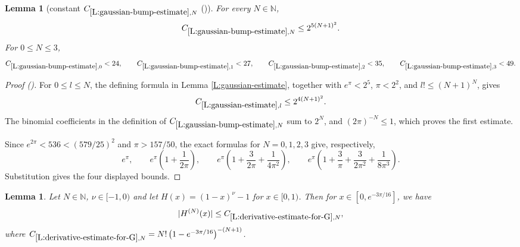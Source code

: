 \documentclass[12pt,reqno]{amsart}
\newcommand{\auto}{{({\tiny\faCar})}}
\theoremstyle{plain}
\newtheorem{lemma}[theorem]{Lemma}
\numberwithin{equation}{section}
\theoremstyle{remark}
\newcommand{\using}[1]{}
\newcommand{\N}{{\mathbb N}}
\newcommand{\jr}[1]{{\color{orange}{[J: #1]}}}
\newcommand{\cgpt}{\tikz\fill[teal!70!black,scale=0.4](0,.35) -- (.25,0) -- (1,.7) -- (.25,.15) -- cycle;}
\begin{document}
\begin{lemma}[constant $C_{\ref{L:gaussian-bump-estimate},N}$ \auto]\label{constant gaussian bump estimate}\using{L:gaussian-estimate}\using{L:gaussian-bump-estimate}
For every $N\in\N$,
\begin{equation}\label{constant gaussian bump estimate bound}
C_{\ref{L:gaussian-bump-estimate},N}\le2^{5(N+1)^2}.
\end{equation}
For $0\le N\le3$,
\begin{equation}\label{auto:constant-gaussian-bump-estimate-small}
C_{\ref{L:gaussian-bump-estimate},0}<24,\qquad
C_{\ref{L:gaussian-bump-estimate},1}<27,\qquad
C_{\ref{L:gaussian-bump-estimate},2}<35,\qquad
C_{\ref{L:gaussian-bump-estimate},3}<49.
\end{equation}
\end{lemma}
\begin{proof}[Proof \auto]
For $0\le l\le N$, the defining formula in Lemma \ref{L:gaussian-estimate}, together with $e^\pi<2^5$, $\pi<2^2$, and $l!\le (N+1)^N$, gives
\[
C_{\ref{L:gaussian-estimate},l}\le2^{4(N+1)^2}.
\]
The binomial coefficients in the definition of $C_{\ref{L:gaussian-bump-estimate},N}$ sum to $2^N$, and $(2\pi)^{-N}\le1$, which proves the first estimate.

Since $e^{2\pi}<536<(579/25)^2$ and $\pi>157/50$, the exact formulas for $N=0,1,2,3$ give, respectively,
\[
e^\pi,
\qquad
e^\pi\left(1+\frac1{2\pi}\right),
\qquad
e^\pi\left(1+\frac3{2\pi}+\frac1{4\pi^2}\right),
\qquad
e^\pi\left(1+\frac3\pi+\frac3{2\pi^2}+\frac1{8\pi^3}\right).
\]
Substitution gives the four displayed bounds.\jr{GPT: Another example of constant waste. When aboslute constants are $<1000$ you don't have to use a power of $2$, instead use the smaller number \cgpt}\jr{GPT: On second thought, we might be making formalization unnecessarily difficult here with these constant evaluations. Please here and in the rest of the manuscript, simplify estimates of expressions involving universal constants as follows: use only the estimate $2<e<3$ for $e$ and the estimate $3<\pi<4$ for $\pi$. If this makes some constants a bit larger, that is acceptable.}
\end{proof}


\begin{lemma}\label{L:derivative-estimate-for-G}
Let $N\in \N$, $\nu\in [-1,0)$ and let $H(x)=(1-x)^{\nu}-1$ for $x\in [0,1)$. Then for $x\in [0,e^{-3\pi/16}]$, we have
\begin{equation}\label{auto:exponential-composition-derivative-bound}
|H^{(N)}(x)| \leq C_{\ref{L:derivative-estimate-for-G},N},
\end{equation}
where $C_{\ref{L:derivative-estimate-for-G},N}= N! \left(1 - e^{-3\pi/16}\right)^{-(N+1)}$.
\end{lemma}
\end{document}
